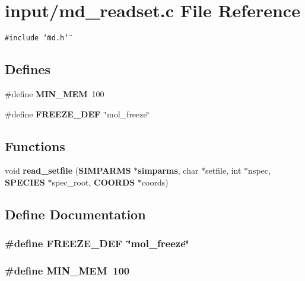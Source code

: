 \section{input/md\_\-readset.c File Reference}
\label{md__readset_8c}
{\tt \#include \char`\"{}md.h\char`\"{}}\par
\subsection*{Defines}
\begin{CompactItemize}
\item 
\#define {\bf MIN\_\-MEM}~100
\item 
\#define {\bf FREEZE\_\-DEF}~\char`\"{}mol\_\-freeze\char`\"{}
\end{CompactItemize}
\subsection*{Functions}
\begin{CompactItemize}
\item 
void {\bf read\_\-setfile} ({\bf SIMPARMS} $\ast${\bf simparms}, char $\ast$setfile, int $\ast$nspec, {\bf SPECIES} $\ast$spec\_\-root, {\bf COORDS} $\ast$coords)
\end{CompactItemize}


\subsection{Define Documentation}
\subsubsection{\setlength{\rightskip}{0pt plus 5cm}\#define FREEZE\_\-DEF~\char`\"{}mol\_\-freeze\char`\"{}}\label{md__readset_8c_895b0a9342a93bb623ffd2ad183f3d2b}


\subsubsection{\setlength{\rightskip}{0pt plus 5cm}\#define MIN\_\-MEM~100}\label{md__readset_8c_222bb42c64dd689a1894480c718306c1}





